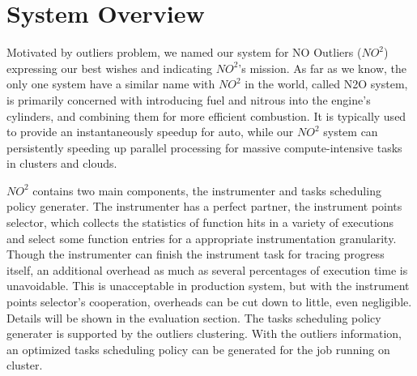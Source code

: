 \section{System Overview}

Motivated by outliers problem, we named our system for NO Outliers ($NO^2$) expressing our best wishes and indicating $NO^2$'s mission. As far as we know, the only one system have a similar name with $NO^2$ in the world, called N2O system, is primarily concerned with introducing fuel and nitrous into the engine's cylinders, and combining them for more efficient combustion. It is typically used to provide an instantaneously speedup for auto, while our $NO^2$ system can persistently speeding up parallel processing for massive compute-intensive tasks in clusters and clouds.

$NO^2$ contains two main components, the instrumenter and tasks scheduling policy generater. The instrumenter has a perfect partner, the instrument points selector, which collects the statistics of function hits in a variety of executions and select some function entries for a appropriate instrumentation granularity. Though the instrumenter can finish the instrument task for tracing progress itself, an additional overhead as much as several percentages of execution time is unavoidable. This is unacceptable in production system, but with the instrument points selector's cooperation, overheads can be cut down to little, even negligible. Details will be shown in the evaluation section. The tasks scheduling policy generater is supported by the outliers clustering. With the outliers information, an optimized tasks scheduling policy can be generated for the job running on cluster.

